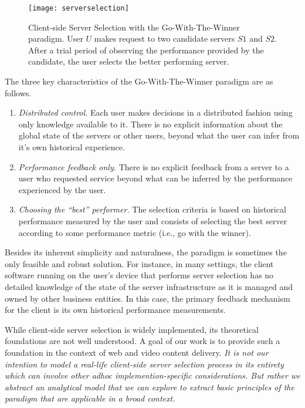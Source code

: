 \documentclass[conference]{IEEEtran}
\begin{document}
\begin{figure}[t]
\centering
\texttt{[image: serverselection]}
\caption{Client-side Server Selection with the Go-With-The-Winner paradigm. User $U$ makes request to two candidate servers $S1$ and $S2$. After a trial period of observing the performance provided by the candidate, the user selects the better performing server.}
\label{fig:serverselection}
\end{figure}
The three key characteristics of the Go-With-The-Winner paradigm are as follows.
\begin{enumerate}
\item {\em Distributed control.} Each user makes decisions in a distributed fashion using only knowledge available to it. There is no explicit information about the global state of the servers or other users, beyond what the user can infer from it's own historical experience.
\item {\em Performance feedback only.} There is no explicit feedback from a server to a user who requested service beyond what can be inferred by the performance experienced by the user.
\item {\em Choosing the ``best'' performer.} The selection criteria is based on historical performance measured by the user and consists of selecting the best server according to some performance metric (i.e., go with the winner).
\end{enumerate}
Besides its inherent simplicity and naturalness, the paradigm is sometimes the only feasible and robust solution.  For instance, in many settings, the client software running on  the user's device that performs server selection has no detailed knowledge of the state of the server infrastructure as it is managed and owned by other business entities. In this case, the primary feedback mechanism for the client is its own historical performance measurements.

While client-side server selection is widely implemented, its theoretical foundations are not well understood. A goal of our work is to provide such a foundation in the context of web and video content delivery.  {\em It is not our intention to model a real-life client-side server selection process in its entirety which can involve other adhoc implemention-specific considerations. But rather we abstract an analytical model that we can explore to extract basic principles of the paradigm that are applicable in a broad context.}
\end{document}
